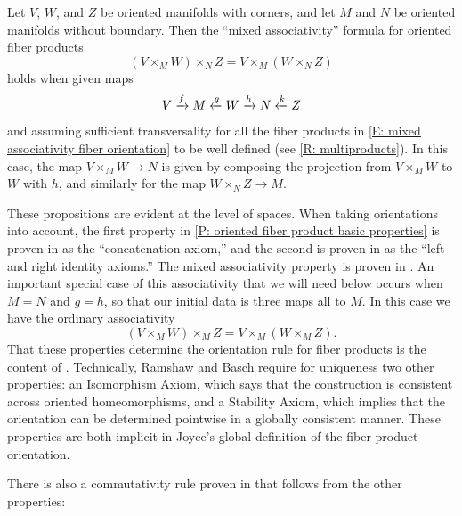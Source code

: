 \begin{proposition}\label{P: oriented fiber mixed associativity}
	Let $V$, $W$, and $Z$ be oriented manifolds with corners, and let $M$ and $N$ be oriented manifolds without boundary.
	Then the ``mixed associativity'' formula for oriented fiber products
	\begin{equation}\label{E: mixed associativity fiber orientation}
		(V \times_M W) \times_N Z = V \times_M (W \times_N Z)
	\end{equation}
	holds when given maps
	$$V \xrightarrow{f} M\xleftarrow{g} W \xrightarrow{h} N \xleftarrow{k} Z$$
	and assuming sufficient transversality for all the fiber products in \eqref{E: mixed associativity fiber orientation} to be well defined (see \cref{R: multiproducts}).
	In this case, the map $V \times_M W \to N$ is given by composing the projection from $V \times_M W$ to $W$ with $h$, and similarly for the map $W \times_N Z \to M$.
\end{proposition}

These propositions are evident at the level of spaces.
When taking orientations into account, the first property in \cref{P: oriented fiber product basic properties} is proven in \cite[Sections 9.3.9]{RamBas09} as the ``concatenation axiom,'' and the second is proven in \cite[Sections 9.3.5 and 9.3.6]{RamBas09} as the ``left and right identity axioms.''
The mixed associativity property is proven in \cite[Sections 9.3.7]{RamBas09}.
An important special case of this associativity that we will need below occurs when $M = N$ and $g = h$, so that our initial data is three maps all to $M$.
In this case we have the ordinary associativity
\begin{equation}\label{E: oriented fiber associativity}
	(V \times_M W) \times_M Z = V \times_M (W \times_M Z).
\end{equation}
That these properties determine the orientation rule for fiber products is the content of \cite[Theorem 9-10]{RamBas09}.
Technically, Ramshaw and Basch require for uniqueness two other properties: an Isomorphism Axiom, which says that the construction is consistent across oriented homeomorphisms, and a Stability Axiom, which implies that the orientation can be determined pointwise in a globally consistent manner.
These properties are both implicit in Joyce's global definition of the fiber product orientation.

There is also a commutativity rule proven in \cite[Sections 9.3.8]{RamBas09} that follows from the other properties:


